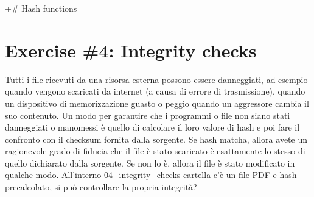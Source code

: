 \documentclass[11pt]{article}
\begin{document}
    +\# Hash functions

    \hypertarget{exercise-4-integrity-checks}{%
\section{Exercise \#4: Integrity
checks}\label{exercise-4-integrity-checks}}

    Tutti i file ricevuti da una risorsa esterna possono essere danneggiati,
ad esempio quando vengono scaricati da internet (a causa di errore di
trasmissione), quando un dispositivo di memorizzazione guasto o peggio
quando un aggressore cambia il suo contenuto. Un modo per garantire che
i programmi o file non siano stati danneggiati o manomessi è quello di
calcolare il loro valore di hash e poi fare il confronto con il checksum
fornita dalla sorgente. Se hash matcha, allora avete un ragionevole
grado di fiducia che il file è stato scaricato è esattamente lo stesso
di quello dichiarato dalla sorgente. Se non lo è, allora il file è stato
modificato in qualche modo. All'interno 04\_integrity\_checks cartella
c'è un file PDF e hash precalcolato, si può controllare la propria
integrità?
\end{document}
